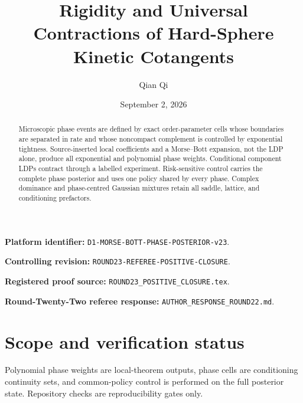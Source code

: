 \documentclass[11pt,reqno]{amsart}
\title[Rigidity and kinetic contractions]{Rigidity and Universal Contractions of Hard-Sphere Kinetic Cotangents}
\author{Qian Qi}
\date{September 2, 2026}
\theoremstyle{definition}
\theoremstyle{remark}
\begin{document}
\raggedbottom
\begin{abstract}
Microscopic phase events are defined by exact order-parameter cells whose
boundaries are separated in rate and whose noncompact complement is controlled
by exponential tightness.  Source-inserted local coefficients and a
Morse--Bott expansion, not the LDP alone, produce all exponential and
polynomial phase weights.  Conditional component LDPs contract through a
labelled experiment.  Risk-sensitive control carries the complete phase
posterior and uses one policy shared by every phase.  Complex dominance and
phase-centred Gaussian mixtures retain all saddle, lattice, and conditioning
prefactors.
\end{abstract}
\maketitle
\noindent\textbf{Platform identifier:} \texttt{D1-MORSE-BOTT-PHASE-POSTERIOR-v23}.\par
\noindent\textbf{Controlling revision:} \texttt{ROUND23-REFEREE-POSITIVE-CLOSURE}.\par
\noindent\textbf{Registered proof source:} \texttt{ROUND23\_POSITIVE\_CLOSURE.tex}.\par
\noindent\textbf{Round-Twenty-Two referee response:} \texttt{AUTHOR\_RESPONSE\_ROUND22.md}.\par
\tableofcontents

\section*{Scope and verification status}
Polynomial phase weights are local-theorem outputs, phase cells are
conditioning continuity sets, and common-policy control is performed on the
full posterior state. Repository checks are reproducibility gates only.
\printbibliography
\end{document}
